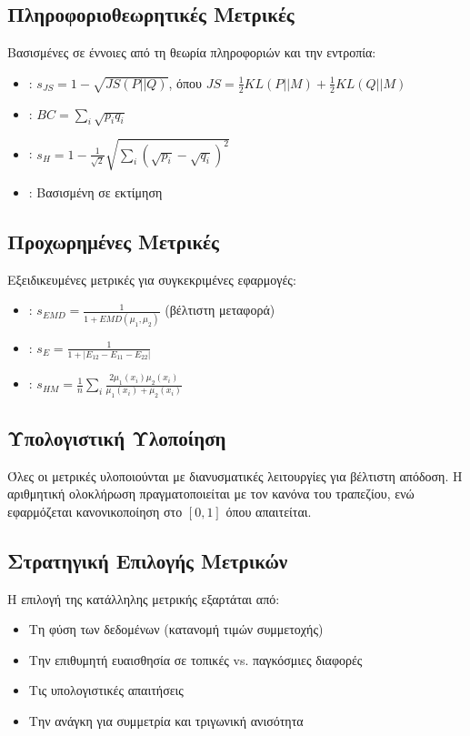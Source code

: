\subsection{Πληροφοριοθεωρητικές Μετρικές}
Βασισμένες σε έννοιες από τη θεωρία πληροφοριών και την εντροπία:

\begin{itemize}
    \item \textbf{}: $s_{JS} = 1 - \sqrt{JS(P||Q)}$, όπου $JS = \frac{1}{2}KL(P||M) + \frac{1}{2}KL(Q||M)$
    \item \textbf{}: $BC = \sum_i \sqrt{p_i q_i}$
    \item \textbf{}: $s_H = 1 - \frac{1}{\sqrt{2}}\sqrt{\sum_i (\sqrt{p_i} - \sqrt{q_i})^2}$
    \item \textbf{}: Βασισμένη σε εκτίμηση 
\end{itemize}

\subsection{Προχωρημένες Μετρικές}
Εξειδικευμένες μετρικές για συγκεκριμένες εφαρμογές:

\begin{itemize}
    \item \textbf{}: $s_{EMD} = \frac{1}{1 + EMD(\mu_1, \mu_2)}$ (βέλτιστη μεταφορά)
    \item \textbf{}: $s_E = \frac{1}{1 + |E_{12} - E_{11} - E_{22}|}$ 
    \item \textbf{}: $s_{HM} = \frac{1}{n}\sum_i \frac{2\mu_1(x_i)\mu_2(x_i)}{\mu_1(x_i) + \mu_2(x_i)}$
\end{itemize}

\subsection{Υπολογιστική Υλοποίηση}
Όλες οι μετρικές υλοποιούνται με διανυσματικές λειτουργίες  για βέλτιστη απόδοση. Η αριθμητική ολοκλήρωση πραγματοποιείται με τον κανόνα του τραπεζίου, ενώ εφαρμόζεται κανονικοποίηση στο $[0,1]$ όπου απαιτείται.

\subsection{Στρατηγική Επιλογής Μετρικών}
Η επιλογή της κατάλληλης μετρικής εξαρτάται από:
\begin{itemize}
    \item Τη φύση των δεδομένων (κατανομή τιμών συμμετοχής)
    \item Την επιθυμητή ευαισθησία σε τοπικές vs. παγκόσμιες διαφορές
    \item Τις υπολογιστικές απαιτήσεις
    \item Την ανάγκη για συμμετρία και τριγωνική ανισότητα
\end{itemize}

